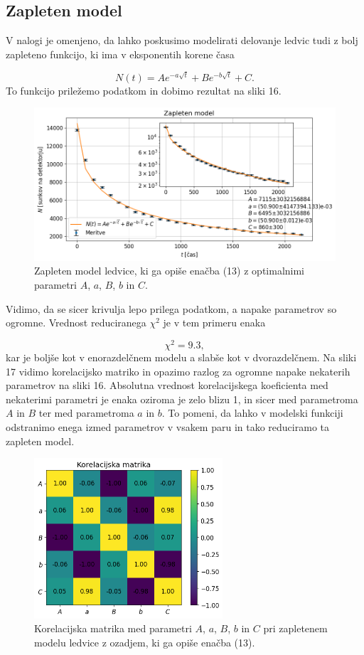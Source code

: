\documentclass[slovene,11pt,a4paper]{article}
\begin{document}
\subsection{Zapleten model}

V nalogi je omenjeno, da lahko poskusimo modelirati delovanje ledvic tudi z bolj zapleteno funkcijo, ki ima v eksponentih korene časa

\begin{equation}
N(t) = Ae^{-a\sqrt{t}} + Be^{-b\sqrt{t}} + C.
\end{equation}
To funkcijo priležemo podatkom in dobimo rezultat na sliki 16.

\begin{figure}[h!]
\centering
\includegraphics[width=13cm]{ledvice10.png}
\caption{Zapleten model ledvice, ki ga opiše enačba (13) z optimalnimi parametri $A$, $a$, $B$, $b$ in $C$.}
\end{figure}
Vidimo, da se sicer krivulja lepo prilega podatkom, a napake parametrov so ogromne. Vrednost reduciranega $\chi^2$ je v tem primeru enaka

\[
\chi^2 = 9.3,
\]
kar je boljše kot v enorazdelčnem modelu a slabše kot v dvorazdelčnem. Na sliki 17 vidimo korelacijsko matriko in opazimo razlog za ogromne napake nekaterih parametrov na sliki 16. Absolutna vrednost korelacijskega koeficienta med nekaterimi parametri je enaka oziroma je zelo blizu 1, in sicer med parametroma $A$ in $B$ ter med parametroma $a$ in $b$. To pomeni, da lahko v modelski funkciji odstranimo enega izmed parametrov v vsakem paru in tako reduciramo ta zapleten model.

\begin{figure}[h!]
\centering
\includegraphics[width=7cm]{ledvice11.png}
\caption{Korelacijska matrika med parametri $A$, $a$, $B$, $b$ in $C$ pri zapletenem modelu ledvice z ozadjem, ki ga opiše enačba (13).}
\end{figure}
\end{document}
